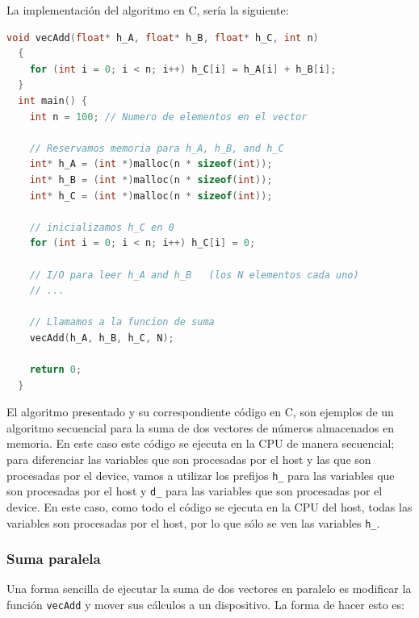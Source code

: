 \newpage

La implementación del algoritmo en C, sería la siguiente:

\begin{lstlisting}[language=C]
  void vecAdd(float* h_A, float* h_B, float* h_C, int n)
  {
    for (int i = 0; i < n; i++) h_C[i] = h_A[i] + h_B[i];
  }
  int main() {
    int n = 100; // Numero de elementos en el vector

    // Reservamos memoria para h_A, h_B, and h_C
    int* h_A = (int *)malloc(n * sizeof(int));
    int* h_B = (int *)malloc(n * sizeof(int));
    int* h_C = (int *)malloc(n * sizeof(int));

    // inicializamos h_C en 0
    for (int i = 0; i < n; i++) h_C[i] = 0;

    // I/O para leer h_A and h_B   (los N elementos cada uno)
    // ...

    // Llamamos a la funcion de suma
    vecAdd(h_A, h_B, h_C, N);

    return 0;
  }
\end{lstlisting}

El algoritmo presentado y su correspondiente código en C, son ejemplos de un algoritmo secuencial para la suma de dos
vectores de números almacenados en memoria. En este caso este código se ejecuta en la CPU de manera secuencial; para
diferenciar las variables que son procesadas por el host y las que son procesadas por el device, vamos a utilizar los
prefijos \texttt{h\_} para las variables que son procesadas por el host y \texttt{d\_} para las variables que son
procesadas por el device. En este caso, como todo el código se ejecuta en la CPU del host, todas las variables son
procesadas por el host, por lo que sólo se ven las variables \texttt{h\_}.

\subsubsection{Suma paralela}

Una forma sencilla de ejecutar la suma de dos vectores en paralelo es modificar la función \texttt{vecAdd} y mover sus
cálculos a un dispositivo. La forma de hacer esto es:

